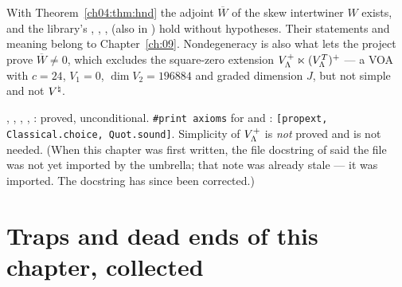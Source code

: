 \begin{remark}
With Theorem~\ref{ch04:thm:hnd} the adjoint $\overline W$ of the skew intertwiner $W$ exists, and the
library's , , ,
 (also in ) hold without hypotheses. Their
statements and meaning belong to Chapter~\ref{ch:09}. Nondegeneracy is also what lets the project
prove $\overline W\neq0$, which excludes the square-zero extension
$V_{\Lambda}^+\ltimes(V_{\Lambda}^T)^+$ --- a VOA with $c=24$, $V_1=0$, $\dim V_2=196884$ and graded
dimension $J$, but not simple and not ${V^{\natural}}$.
\end{remark}

\begin{status}
, , ,
, : proved, unconditional. \texttt{\#print
axioms} for  and : \texttt{[propext,
Classical.choice, Quot.sound]}. Simplicity of $V_{\Lambda}^+$ is \emph{not} proved and is not needed.
(When this chapter was first written, the file docstring of  said the file was not yet
imported by the umbrella; that note was already stale --- it was imported. The docstring has since been
corrected.)
\end{status}
\section{Traps and dead ends of this chapter, collected}\label{ch04:sec:traps}

